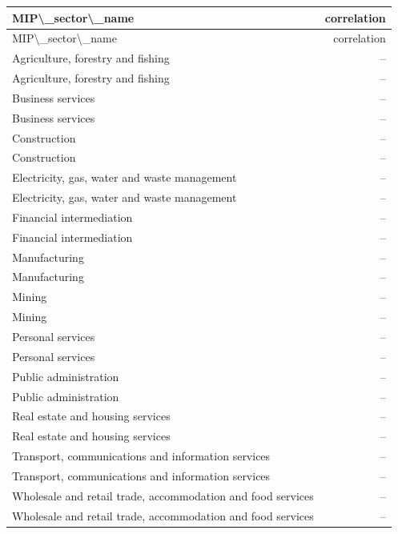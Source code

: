 \begin{longtable}{lr}
\hline
MIP\textbackslash{}_sector\textbackslash{}_name & correlation \\ 
\hline\endfirsthead
\hline
MIP\textbackslash{}_sector\textbackslash{}_name & correlation \\ 
\hline\endhead
Agriculture, forestry and fishing & -- \\ 
Agriculture, forestry and fishing & -- \\ 
Business services & -- \\ 
Business services & -- \\ 
Construction & -- \\ 
Construction & -- \\ 
Electricity, gas, water and waste management & -- \\ 
Electricity, gas, water and waste management & -- \\ 
Financial intermediation & -- \\ 
Financial intermediation & -- \\ 
Manufacturing & -- \\ 
Manufacturing & -- \\ 
Mining & -- \\ 
Mining & -- \\ 
Personal services & -- \\ 
Personal services & -- \\ 
Public administration & -- \\ 
Public administration & -- \\ 
Real estate and housing services & -- \\ 
Real estate and housing services & -- \\ 
Transport, communications and information services & -- \\ 
Transport, communications and information services & -- \\ 
Wholesale and retail trade, accommodation and food services & -- \\ 
Wholesale and retail trade, accommodation and food services & -- \\ 
\hline
\end{longtable}
